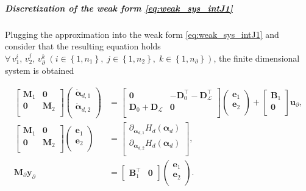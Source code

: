 \subparagraph{Discretization of the weak form \eqref{eq:weak_sys_intJ1}}
Plugging the approximation into the weak form \eqref{eq:weak_sys_intJ1} and consider that the resulting equation holds $\forall \, v_1^i,\, v_2^j,\, v_\partial^k \; (i\in\left\{1,n_1\right\}, \; j\in\left\{1,n_2\right\}, \; k\in\left\{1,n_\partial\right\})$, the finite dimensional system is obtained

\begin{equation}\label{eq:pHsys_findim_J1}
\begin{aligned}
\begin{bmatrix}
\mathbf{M}_1 & \mathbf{0} \\
\mathbf{0} & \mathbf{M}_2 \\
\end{bmatrix}
\begin{pmatrix}
\dot{\bm{\alpha}}_{d, 1} \\
\dot{\bm{\alpha}}_{d, 2} \\
\end{pmatrix}
&= \begin{bmatrix}
\mathbf{0} & -\mathbf{D}_{0}^\top - \mathbf{D}_{\mathcal{L}}^\top \\
\mathbf{D}_{0} + \mathbf{D}_{\mathcal{L}} & \mathbf{0} \\
\end{bmatrix} 
\begin{pmatrix}
\mathbf{e}_{1} \\
\mathbf{e}_{2} \\
\end{pmatrix} + 
\begin{bmatrix}
\mathbf{B}_1\\
\mathbf{0}\\
\end{bmatrix}
\mathbf{u}_\partial, \\
\begin{bmatrix}
\mathbf{M}_1 & \mathbf{0} \\
\mathbf{0} & \mathbf{M}_2 \\
\end{bmatrix}
\begin{pmatrix}
\mathbf{e}_{1} \\
\mathbf{e}_{2} \\
\end{pmatrix}
&= \begin{bmatrix}
\partial_{\bm{\alpha}_{d, 1}} H_d(\bm{\alpha}_d)\\
\partial_{\bm{\alpha}_{d, 2}} H_d(\bm{\alpha}_d)\\
\end{bmatrix}, \\
\mathbf{M}_\partial {\mathbf{y}_\partial} &= \begin{bmatrix}
\mathbf{B}_1^\top & \mathbf{0}
\end{bmatrix}\begin{pmatrix}
\mathbf{e}_{1} \\
\mathbf{e}_{2} \\
\end{pmatrix}.
\end{aligned}
\end{equation}
